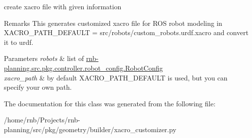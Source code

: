 create xacro file with given information 

\begin{DoxyRemark}{Remarks}
This generates customized xacro file for R\+OS robot modeling in X\+A\+C\+R\+O\+\_\+\+P\+A\+T\+H\+\_\+\+D\+E\+F\+A\+U\+LT = \textquotesingle{}src/robots/custom\+\_\+robots.\+urdf.\+xacro\textquotesingle{} and convert it to urdf. 
\end{DoxyRemark}

\begin{DoxyParams}{Parameters}
{\em robots} & list of \hyperlink{classrnb-planning_1_1src_1_1pkg_1_1controller_1_1robot__config_1_1_robot_config}{rnb-\/planning.\+src.\+pkg.\+controller.\+robot\+\_\+config.\+Robot\+Config} \\
\hline
{\em xacro\+\_\+path} & by default X\+A\+C\+R\+O\+\_\+\+P\+A\+T\+H\+\_\+\+D\+E\+F\+A\+U\+LT is used, but you can specify your own path. \\
\hline
\end{DoxyParams}


The documentation for this class was generated from the following file\+:\begin{DoxyCompactItemize}
\item 
/home/rnb/\+Projects/rnb-\/planning/src/pkg/geometry/builder/xacro\+\_\+customizer.\+py\end{DoxyCompactItemize}
